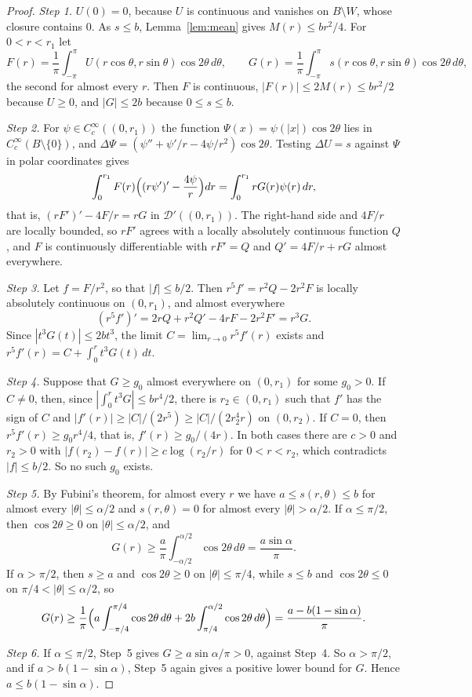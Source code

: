 \documentclass[11pt]{amsart}
\theoremstyle{remark}
\numberwithin{equation}{section}
\newcommand{\D}{\mathcal D}
\begin{document}
\begin{proof}
\emph{Step 1.} $U(0)=0$, because $U$ is continuous and vanishes on $B\setminus W$, whose closure contains $0$. As $s\le b$, Lemma~\ref{lem:mean} gives $M(r)\le br^2/4$. For $0<r<r_1$ let
\[
F(r)=\frac1\pi\int_{-\pi}^{\pi}U(r\cos\theta,r\sin\theta)\cos2\theta\,d\theta,\qquad G(r)=\frac1\pi\int_{-\pi}^{\pi}s(r\cos\theta,r\sin\theta)\cos2\theta\,d\theta,
\]
the second for almost every $r$. Then $F$ is continuous, $|F(r)|\le2M(r)\le br^2/2$ because $U\ge0$, and $|G|\le2b$ because $0\le s\le b$.

\emph{Step 2.} For $\psi\in C_c^\infty((0,r_1))$ the function $\Psi(x)=\psi(|x|)\cos2\theta$ lies in $C_c^\infty(B\setminus\{0\})$, and $\Delta\Psi=(\psi''+\psi'/r-4\psi/r^2)\cos2\theta$. Testing $\Delta U=s$ against $\Psi$ in polar coordinates gives
\[
\int_0^{r_1}F(r)\Bigl((r\psi')'-\frac{4\psi}r\Bigr)dr=\int_0^{r_1}rG(r)\psi(r)\,dr,
\]
that is, $(rF')'-4F/r=rG$ in $\D'((0,r_1))$. The right-hand side and $4F/r$ are locally bounded, so $rF'$ agrees with a locally absolutely continuous function $Q$, and $F$ is continuously differentiable with $rF'=Q$ and $Q'=4F/r+rG$ almost everywhere.

\emph{Step 3.} Let $f=F/r^2$, so that $|f|\le b/2$. Then $r^5f'=r^2Q-2r^2F$ is locally absolutely continuous on $(0,r_1)$, and almost everywhere
\[
(r^5f')'=2rQ+r^2Q'-4rF-2r^2F'=r^3G.
\]
Since $|t^3G(t)|\le2bt^3$, the limit $C=\lim_{r\to0}r^5f'(r)$ exists and $r^5f'(r)=C+\int_0^rt^3G(t)\,dt$.

\emph{Step 4.} Suppose that $G\ge g_0$ almost everywhere on $(0,r_1)$ for some $g_0>0$. If $C\ne0$, then, since $|\int_0^rt^3G|\le br^4/2$, there is $r_2\in(0,r_1)$ such that $f'$ has the sign of $C$ and $|f'(r)|\ge|C|/(2r^5)\ge|C|/(2r_2^4r)$ on $(0,r_2)$. If $C=0$, then $r^5f'(r)\ge g_0r^4/4$, that is, $f'(r)\ge g_0/(4r)$. In both cases there are $c>0$ and $r_2>0$ with $|f(r_2)-f(r)|\ge c\log(r_2/r)$ for $0<r<r_2$, which contradicts $|f|\le b/2$. So no such $g_0$ exists.

\emph{Step 5.} By Fubini's theorem, for almost every $r$ we have $a\le s(r,\theta)\le b$ for almost every $|\theta|\le\alpha/2$ and $s(r,\theta)=0$ for almost every $|\theta|>\alpha/2$. If $\alpha\le\pi/2$, then $\cos2\theta\ge0$ on $|\theta|\le\alpha/2$, and
\[
G(r)\ge\frac a\pi\int_{-\alpha/2}^{\alpha/2}\cos2\theta\,d\theta=\frac{a\sin\alpha}\pi.
\]
If $\alpha>\pi/2$, then $s\ge a$ and $\cos2\theta\ge0$ on $|\theta|\le\pi/4$, while $s\le b$ and $\cos2\theta\le0$ on $\pi/4<|\theta|\le\alpha/2$, so
\[
G(r)\ge\frac1\pi\Bigl(a\int_{-\pi/4}^{\pi/4}\cos2\theta\,d\theta+2b\int_{\pi/4}^{\alpha/2}\cos2\theta\,d\theta\Bigr)=\frac{a-b(1-\sin\alpha)}\pi.
\]

\emph{Step 6.} If $\alpha\le\pi/2$, Step~5 gives $G\ge a\sin\alpha/\pi>0$, against Step~4. So $\alpha>\pi/2$, and if $a>b(1-\sin\alpha)$, Step~5 again gives a positive lower bound for $G$. Hence $a\le b(1-\sin\alpha)$.
\end{proof}
\end{document}
